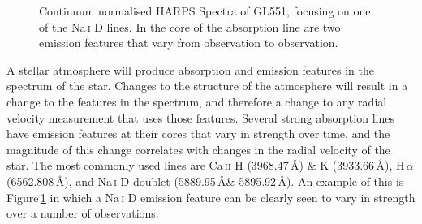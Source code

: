 \begin{figure}
    \captionsetup{width=.8\textwidth}
    \caption{Continuum normalised HARPS Spectra of GL551, focusing on one of the Na\,\textsc{i} D lines. In the core of the absorption line are two emission features that vary from observation to observation.}
    \label{figNaD_line}
\end{figure}

A stellar atmosphere will produce absorption and emission features in the spectrum of the star. Changes to the structure of the atmosphere will result in a change to the features in the spectrum, and therefore a change to any radial velocity measurement that uses those features. Several strong absorption lines have emission features at their cores that vary in strength over time, and the magnitude of this change correlates with changes in the radial velocity of the star. The most commonly used lines are Ca\,\textsc{ii} H (3968.47\,\AA) \& K (3933.66\,\AA), H\,\textsc{$\alpha$} (6562.808\,\AA), and Na\,\textsc{i} D doublet (5889.95\,\AA \& 5895.92\,\AA). An example of this is Figure\,\ref{figNaD_line} in which a Na\,\textsc{i} D emission feature can be clearly seen to vary in strength over a number of observations.\\

